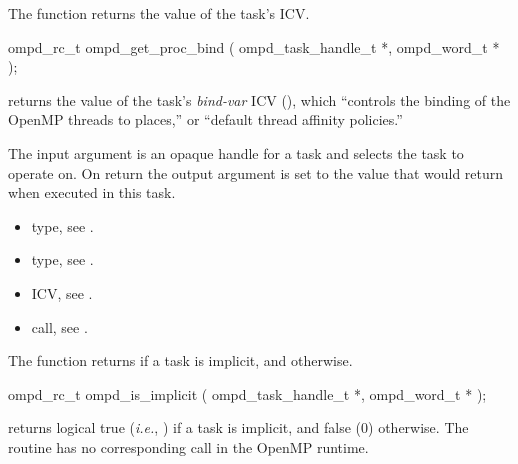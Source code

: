%
\label{subsubsubsec:ompd_get_proc_bind}
\summary
The  function returns the value of the task's  ICV.

\format
\begin{cspecific}
\begin{ompSyntax}
ompd_rc_t ompd_get_proc_bind (
  ompd_task_handle_t *,
  ompd_word_t *
);
\end{ompSyntax}
\end{cspecific}

\descr
{} returns the value of the task's
\emph{bind-var} ICV (), which ``controls the
binding of the OpenMP threads to places,'' or ``default thread
affinity policies.''

\argdesc
The input argument  is an opaque handle for a task and selects the task to operate on.
On return the output argument  is set to the value that  would return when
executed in this task.
%

\crossreferences
\begin{itemize}
  \item {} type, see .
	\item {} type, see .
	\item {} ICV, see .
	\item {} call, see .
\end{itemize}

\label{subsubsubsec:ompd_is_implicit}
\summary
The  function returns  if a task is implicit, and  otherwise.

\format
\begin{cspecific}
\begin{ompSyntax}
ompd_rc_t ompd_is_implicit (
  ompd_task_handle_t *,
  ompd_word_t *
);
\end{ompSyntax}
\end{cspecific}

\descr
{} returns logical true (\textit{i.e.}, )
if a task is implicit, and false (0) otherwise.
The routine has no corresponding call in the OpenMP runtime.

